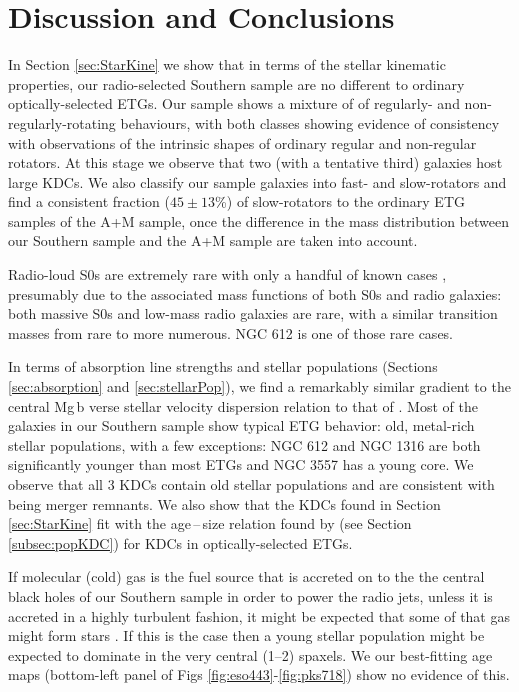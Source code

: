 \documentclass[a4paper,fleqn,usenatbib]{mnras}
\begin{document}
\section{Discussion and Conclusions}
	\label{sec:discuss}
	In Section \ref{sec:StarKine} we show that in terms of the stellar kinematic properties, our radio-selected Southern sample are no different to ordinary optically-selected ETGs. Our sample shows a mixture of of regularly- and non-regularly-rotating behaviours, with both classes showing evidence of consistency with observations of the intrinsic shapes of ordinary regular and non-regular rotators. At this stage we observe that two (with a tentative third) galaxies host large KDCs. We also classify our sample galaxies into fast- and slow-rotators and find a consistent fraction ($45\pm13$\%) of slow-rotators to the ordinary ETG samples of the A+M sample, once the difference in the mass distribution between our Southern sample and the A+M sample are taken into account.

	Radio-loud S0s are extremely rare with only a handful of known cases \citep[e.g.][]{Heckman1982, Morganti2011}, presumably due to the associated mass functions of both S0s and radio galaxies: both massive S0s and low-mass radio galaxies are rare, with a similar transition masses from rare to more numerous. NGC 612 is one of those rare cases.

	In terms of absorption line strengths and stellar populations (Sections \ref{sec:absorption} and \ref{sec:stellarPop}), we find a remarkably similar gradient to the central Mg\,b verse stellar velocity dispersion relation to that of \citet{Ziegler1997}. Most of the galaxies in our Southern sample show typical ETG behavior: old, metal-rich stellar populations, with a few exceptions: NGC 612 and NGC 1316 are both significantly younger than most ETGs and NGC 3557 has a young core. We observe that all 3 KDCs contain old stellar populations and are consistent with being merger remnants. We also show that the KDCs found in Section \ref{sec:StarKine} fit with the age\,--\,size relation found by \citet{Kuntschner2010} (see Section \ref{subsec:popKDC}) for KDCs in optically-selected ETGs.

	If molecular (cold) gas is the fuel source that is accreted on to the the central black holes of our Southern sample in order to power the radio jets, unless it is accreted in a highly turbulent fashion, it might be expected that some of that gas might form stars \citep[e.g.][]{Collin1999, Diamond-Stanic2012, LaMassa2013}. If this is the case then a young stellar population might be expected to dominate in the very central (1--2) spaxels. We our best-fitting age maps (bottom-left panel of Figs \ref{fig:eso443}-\ref{fig:pks718}) show no evidence of this. 	
\end{document}

